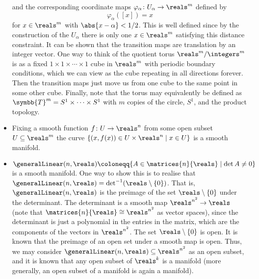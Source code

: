\documentclass[fleqn]{NotesClass}
\newcommand{\torus}{\symbb{T}}
\newcommand{\isomorphic}{\cong}
\begin{document}
\begin{exm}{}{}
\begin{itemize}
            and the corresponding coordinate maps \(\varphi_\alpha \colon U_\alpha \to \reals^m\) defined by
            \begin{equation}
                \varphi_\alpha([x]) = x
            \end{equation}
            for \(x \in \reals^m\) with \(\abs{x - \alpha} < 1/2\).
            This is well defined since by the construction of the \(U_\alpha\) there is only one \(x \in \reals^m\) satisfying this distance constraint.
            It can be shown that the transition maps are translation by an integer vector.
            One way to think of the quotient torus \(\reals^m/\integers^m\) is as a fixed \(1 \times 1 \times \dotsb \times 1\) cube in \(\reals^m\) with periodic boundary conditions, which we can view as the cube repeating in all directions forever.
            Then the transition maps just move us from one cube to the same point in some other cube.
            Finally, note that the torus may equivalently be defined as \(\torus^m = S^1 \times \dotsb \times S^1\) with \(m\) copies of the circle, \(S^1\), and the product topology.
            \item Fixing a smooth function \(f \colon U \to \reals^n\) from some open subset \(U \subseteq \reals^m\) the curve \(\{(x, f(x)) \in U \times \reals^n \mid x \in U\}\) is a smooth manifold.
            \item \(\generalLinear(n, \reals) \coloneqq \{A \in \matrices{n}{\reals} \mid \det A \ne 0\}\) is a smooth manifold.
            One way to show this is to realise that \(\generalLinear(n, \reals) = \det^{-1}(\reals \setminus \{0\})\).
            That is, \(\generalLinear(n, \reals)\) is the preimage of the set \(\reals \setminus \{0\}\) under the determinant.
            The determinant is a smooth map \(\reals^{n^2} \to \reals\) (note that \(\matrices{n}{\reals} \isomorphic \reals^{n^2}\) as vector spaces), since the determinant is just a polynomial in the entries in the matrix, which are the components of the vectors in \(\reals^{n^2}\).
            The set \(\reals \setminus \{0\}\) is open.
            It is known that the preimage of an open set under a smooth map is open.
            Thus, we may consider \(\generalLinear(n, \reals) \subseteq \reals^{n^2}\) as an open subset, and it is known that any open subset of \(\reals^k\) is a manifold (more generally, an open subset of a manifold is again a manifold).
        \end{itemize}
    \end{exm}
    
\end{document}

